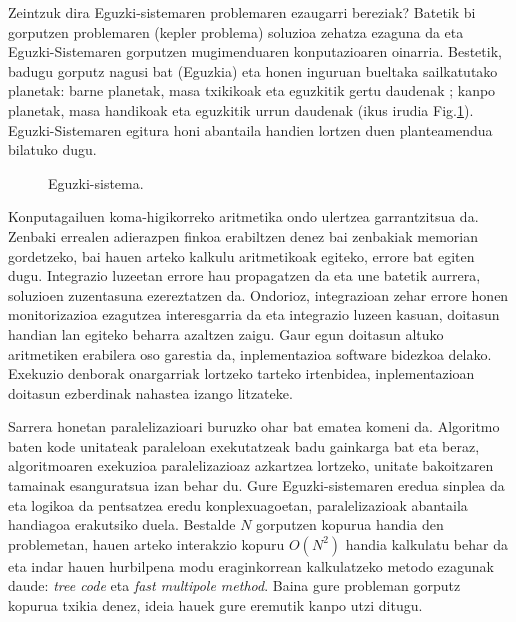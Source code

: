 Zeintzuk dira Eguzki-sistemaren problemaren ezaugarri bereziak? Batetik bi gorputzen problemaren (kepler problema) soluzioa zehatza ezaguna da eta Eguzki-Sistemaren gorputzen mugimenduaren konputazioaren oinarria. Bestetik,  badugu gorputz nagusi bat (Eguzkia) eta honen inguruan bueltaka sailkatutako planetak: barne planetak, masa txikikoak eta eguzkitik gertu daudenak ; kanpo planetak, masa handikoak eta eguzkitik urrun daudenak (ikus irudia Fig.\ref{fig:plot1}). Eguzki-Sistemaren egitura honi abantaila handien lortzen duen planteamendua bilatuko dugu.



\begin{figure}[h]
\centering
{}
\caption{\small Eguzki-sistema.}
\label{fig:plot1}
\end{figure}    
   
Konputagailuen koma-higikorreko aritmetika ondo ulertzea garrantzitsua da. Zenbaki errealen adierazpen finkoa erabiltzen denez bai zenbakiak memorian gordetzeko, bai hauen arteko kalkulu aritmetikoak egiteko, errore bat egiten dugu. Integrazio luzeetan errore hau propagatzen da eta une batetik aurrera, soluzioen zuzentasuna ezereztatzen da. Ondorioz, integrazioan zehar errore honen monitorizazioa ezagutzea interesgarria da eta integrazio luzeen kasuan, doitasun handian lan egiteko beharra azaltzen zaigu. Gaur egun doitasun altuko aritmetiken erabilera oso garestia da, inplementazioa software bidezkoa delako. Exekuzio denborak onargarriak lortzeko tarteko irtenbidea, inplementazioan doitasun ezberdinak nahastea izango litzateke.       

Sarrera honetan paralelizazioari buruzko ohar bat ematea komeni da. Algoritmo baten kode unitateak paraleloan exekutatzeak badu gainkarga bat eta beraz,  algoritmoaren exekuzioa paralelizazioaz azkartzea lortzeko,  unitate bakoitzaren tamainak esanguratsua izan behar du. Gure Eguzki-sistemaren eredua sinplea da eta logikoa da pentsatzea eredu konplexuagoetan, paralelizazioak abantaila handiagoa erakutsiko duela. Bestalde $N$ gorputzen kopurua handia den problemetan, hauen arteko interakzio kopuru $O(N^2)$ handia kalkulatu behar da eta indar hauen hurbilpena modu eraginkorrean kalkulatzeko metodo ezagunak daude: \textit {tree code} eta \textit {fast multipole method}. Baina gure probleman gorputz kopurua txikia denez, ideia hauek gure eremutik kanpo utzi ditugu. 

